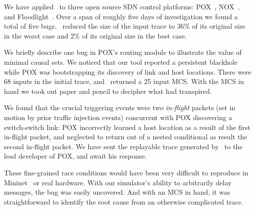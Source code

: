 We have applied \simulator~to three open source SDN control platforms:
POX~\cite{pox}, NOX~\cite{nox}, and Floodlight~\cite{bigswitch}. Over a span
of roughly five days of
investigation we found a total of five bugs. \Simulator~reduced the
size of the input trace to 36\% of its original size in
the worst case and 2\% of its original size in the best case.

We briefly describe one bug in POX's routing module to illustrate the value of minimal causal sets.
We noticed that our tool reported a persistent blackhole while POX was bootstrapping its
discovery of link and host locations. There were 68 inputs in the initial trace, and \simulator~returned a 25 input
MCS. With the MCS in hand we took out paper and pencil to decipher what had
transpired.

We found that the crucial triggering events were two
{\em in-flight} packets (set in motion by prior traffic injection events)
concurrent with POX discovering a switch-switch link:
POX incorrectly learned a host location as a result of the first in-flight
packet, and
neglected to return out of a nested conditional as result the second in-flight
packet. We have sent the replayable trace generated by \simulator~to the lead
developer of POX, and await his response.

These fine-grained race conditions would have been very difficult to reproduce
in Mininet~\cite{handigol2012reproducible} or real hardware. With our
simulator's ability to arbitrarily delay messages, the bug was easily uncovered. And with
an MCS in hand, it was straightforward to identify the root cause from an
otherwise complicated trace.
